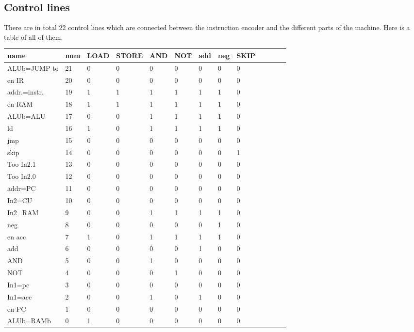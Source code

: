 \documentclass{article}
\begin{document}
\subsection{Control lines}
There are in total 22 control lines which are connected between the instruction encoder and the different parts of the machine. Here is a table of all of them.
	\begin{tabular}{l l l l l l l l l l l l l }
		\hline
		name 		& num & LOAD & STORE & AND & NOT & add & neg & SKIP    \\  \hline
		ALUb=JUMP to	& 21  & 0    & 0     & 0   & 0   & 0   & 0   & 0        \\ \hline
		en IR		& 20  & 0    & 0     & 0   & 0   & 0   & 0   & 0        \\ \hline
		addr.=instr.	& 19  & 1    & 1     & 1   & 1   & 1   & 1   & 0        \\ \hline
		en RAM		& 18  & 1    & 1     & 1   & 1   & 1   & 1   & 0        \\ \hline
		ALUb=ALU	& 17  & 0    & 0     & 1   & 1   & 1   & 1   & 0        \\ \hline
		ld		& 16  & 1    & 0     & 1   & 1   & 1   & 1   & 0        \\ \hline
		jmp		& 15  & 0    & 0     & 0   & 0   & 0   & 0   & 0        \\ \hline
		skip		& 14  & 0    & 0     & 0   & 0   & 0   & 0   & 1        \\ \hline
		\hline                                                             
		Too In2.1	& 13  & 0    & 0     & 0   & 0   & 0   & 0   & 0        \\ \hline
		Too In2.0      	& 12  & 0    & 0     & 0   & 0   & 0   & 0   & 0        \\ \hline
		\hline                                                             
		addr=PC		& 11  & 0    & 0     & 0   & 0   & 0   & 0   & 0        \\ \hline
		In2=CU	        & 10  & 0    & 0     & 0   & 0   & 0   & 0   & 0        \\ \hline
		In2=RAM	        & 9   & 0    & 0     & 1   & 1   & 1   & 1   & 0        \\ \hline
		neg	        & 8   & 0    & 0     & 0   & 0   & 0   & 1   & 0        \\ \hline
		en acc	        & 7   & 1    & 0     & 1   & 1   & 1   & 1   & 0        \\ \hline
		add	        & 6   & 0    & 0     & 0   & 0   & 1   & 0   & 0        \\ \hline
		AND	        & 5   & 0    & 0     & 1   & 0   & 0   & 0   & 0        \\ \hline
		NOT	        & 4   & 0    & 0     & 0   & 1   & 0   & 0   & 0        \\ \hline
		In1=pc	        & 3   & 0    & 0     & 0   & 0   & 0   & 0   & 0        \\ \hline
		In1=acc	 	& 2   & 0    & 0     & 1   & 0   & 1   & 0   & 0        \\ \hline
		en PC	 	& 1   & 0    & 0     & 0   & 0   & 0   & 0   & 0        \\ \hline
		ALUb=RAMb	& 0   & 1    & 0     & 0   & 0   & 0   & 0   & 0            
	\end{tabular}
\end{document}
